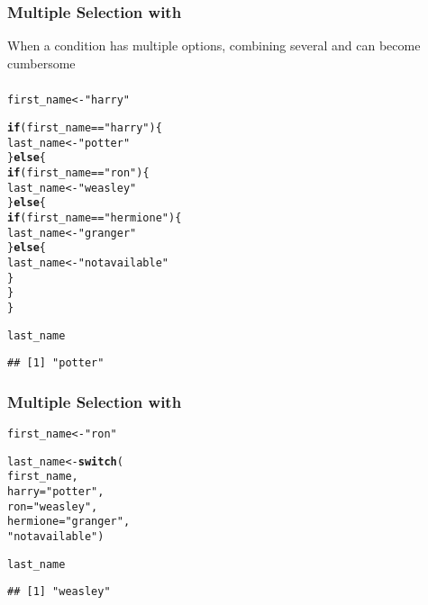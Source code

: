 \documentclass[12pt]{beamer}\usepackage[]{graphicx}\usepackage[]{color}
\makeatletter
\newcommand{\hlstr}[1]{\textcolor[rgb]{0.192,0.494,0.8}{#1}}%
\newcommand{\hlopt}[1]{\textcolor[rgb]{0,0,0}{#1}}%
\newcommand{\hlstd}[1]{\textcolor[rgb]{0.345,0.345,0.345}{#1}}%
\newcommand{\hlkwa}[1]{\textcolor[rgb]{0.161,0.373,0.58}{\textbf{#1}}}%
\newcommand{\hlkwb}[1]{\textcolor[rgb]{0.69,0.353,0.396}{#1}}%
\newcommand{\hlkwc}[1]{\textcolor[rgb]{0.333,0.667,0.333}{#1}}%
\newcommand{\hlkwd}[1]{\textcolor[rgb]{0.737,0.353,0.396}{\textbf{#1}}}%
\newenvironment{kframe}{%
 \def\at@end@of@kframe{}%
 \ifinner\ifhmode%
  \def\at@end@of@kframe{\end{minipage}}%
  \begin{minipage}{\columnwidth}%
 \fi\fi%
 \def\FrameCommand##1{\hskip\@totalleftmargin \hskip-\fboxsep
 \colorbox{shadecolor}{##1}\hskip-\fboxsep
     \hskip-\linewidth \hskip-\@totalleftmargin \hskip\columnwidth}%
 \MakeFramed {\advance\hsize-\width
   \@totalleftmargin\z@ \linewidth\hsize
   \@setminipage}}%
 {\par\unskip\endMakeFramed%
 \at@end@of@kframe}
\newenvironment{knitrout}{}{} %
\makeatother
\begin{document}
\begin{frame}[fragile]
\frametitle{Multiple Selection with }

{\large When a condition has multiple options, combining several  and  can become cumbersome}

\end{frame}


\begin{frame}[fragile]
\frametitle{}

\begin{knitrout}\footnotesize
{}\color{fgcolor}\begin{kframe}
\begin{alltt}
\hlstd{first_name} \hlkwb{<-} \hlstr{"harry"}

\hlkwa{if} \hlstd{(first_name} \hlopt{==} \hlstr{"harry"}\hlstd{) \{}
  \hlstd{last_name} \hlkwb{<-} \hlstr{"potter"}
\hlstd{\}} \hlkwa{else} \hlstd{\{}
  \hlkwa{if} \hlstd{(first_name} \hlopt{==} \hlstr{"ron"}\hlstd{) \{}
    \hlstd{last_name} \hlkwb{<-} \hlstr{"weasley"}
  \hlstd{\}} \hlkwa{else} \hlstd{\{}
    \hlkwa{if} \hlstd{(first_name} \hlopt{==} \hlstr{"hermione"}\hlstd{) \{}
      \hlstd{last_name} \hlkwb{<-} \hlstr{"granger"}
    \hlstd{\}} \hlkwa{else} \hlstd{\{}
      \hlstd{last_name} \hlkwb{<-} \hlstr{"not available"}
    \hlstd{\}}
  \hlstd{\}}
\hlstd{\}}

\hlstd{last_name}
\end{alltt}
\begin{verbatim}
## [1] "potter"
\end{verbatim}
\end{kframe}
\end{knitrout}

\end{frame}


\begin{frame}[fragile]
\frametitle{Multiple Selection with }

\begin{knitrout}\footnotesize
{}\color{fgcolor}\begin{kframe}
\begin{alltt}
\hlstd{first_name} \hlkwb{<-} \hlstr{"ron"}

\hlstd{last_name} \hlkwb{<-} \hlkwd{switch}\hlstd{(}
  \hlstd{first_name,}
  \hlkwc{harry} \hlstd{=} \hlstr{"potter"}\hlstd{,}
  \hlkwc{ron} \hlstd{=} \hlstr{"weasley"}\hlstd{,}
  \hlkwc{hermione} \hlstd{=} \hlstr{"granger"}\hlstd{,}
  \hlstr{"not available"}\hlstd{)}

\hlstd{last_name}
\end{alltt}
\begin{verbatim}
## [1] "weasley"
\end{verbatim}
\end{kframe}
\end{knitrout}

\end{frame}
\end{document}
